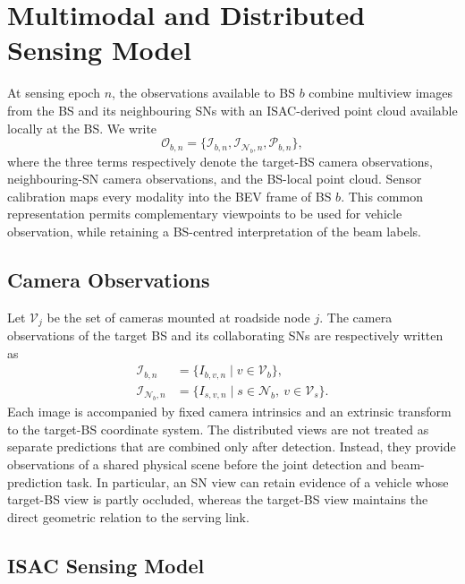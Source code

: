 \section{Multimodal and Distributed Sensing Model}
\label{sec:system-sensing}

At sensing epoch \(n\), the observations available to BS \(b\) combine multiview
images from the BS and its neighbouring SNs with an ISAC-derived point cloud
available locally at the BS.  We write
\begin{equation}
    \mathcal{O}_{b,n}
    = \bigl\{\mathcal{I}_{b,n},\mathcal{I}_{\mathcal{N}_b,n},
    \mathcal{P}_{b,n}\bigr\},
    \label{eq:system-sensing-observation}
\end{equation}
where the three terms respectively denote the target-BS camera observations,
neighbouring-SN camera observations, and the BS-local point cloud.  Sensor
calibration maps every modality into the BEV frame of BS \(b\).  This common
representation permits complementary viewpoints to be used for vehicle
observation, while retaining a BS-centred interpretation of the beam labels.

\subsection{Camera Observations}
\label{subsec:system-camera}

Let \(\mathcal{V}_j\) be the set of cameras mounted at roadside node \(j\).  The
camera observations of the target BS and its collaborating SNs are respectively
written as
\begin{align}
    \mathcal{I}_{b,n} & = \{I_{b,v,n}\mid v\in\mathcal{V}_b\}, \\
    \mathcal{I}_{\mathcal{N}_b,n} & =
    \{I_{s,v,n}\mid s\in\mathcal{N}_b,\ v\in\mathcal{V}_s\}.
    \label{eq:system-camera-observations}
\end{align}
Each image is accompanied by fixed camera intrinsics and an extrinsic transform
to the target-BS coordinate system.  The distributed views are not treated as
separate predictions that are combined only after detection.  Instead, they
provide observations of a shared physical scene before the joint detection and
beam-prediction task.  In particular, an SN view can retain evidence of a
vehicle whose target-BS view is partly occluded, whereas the target-BS view
maintains the direct geometric relation to the serving link.

\subsection{ISAC Sensing Model}
\label{subsec:system-isac}

